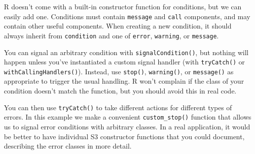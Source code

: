 R doesn't come with a built-in constructor function for conditions, but
we can easily add one. Conditions must contain \texttt{message} and
\texttt{call} components, and may contain other useful components. When
creating a new condition, it should always inherit from
\texttt{condition} and one of \texttt{error}, \texttt{warning}, or
\texttt{message}.

\begin{Shaded}
\begin{Highlighting}[]
\StringTok{ } \NormalTok{(-}
  \NormalTok{(}
     \NormalTok{),}
    \NormalTok{(}  
  \NormalTok{)}
\NormalTok{\}}
\StringTok{ }\NormalTok{)}
\end{Highlighting}
\end{Shaded}

You can signal an arbitrary condition with \texttt{signalCondition()},
but nothing will happen unless you've instantiated a custom signal
handler (with \texttt{tryCatch()} or \texttt{withCallingHandlers()}).
Instead, use \texttt{stop()}, \texttt{warning()}, or \texttt{message()}
as appropriate to trigger the usual handling. R won't complain if the
class of your condition doesn't match the function, but you should avoid
this in real code. 

\begin{Shaded}
\begin{Highlighting}[]
\StringTok{ }\NormalTok{(}\NormalTok{(}\NormalTok{, }\NormalTok{), }\NormalTok{)}
\end{Highlighting}
\end{Shaded}

You can then use \texttt{tryCatch()} to take different actions for
different types of errors. In this example we make a convenient
\texttt{custom\_stop()} function that allows us to signal error
conditions with arbitrary classes. In a real application, it would be
better to have individual S3 constructor functions that you could
document, describing the error classes in more detail.


